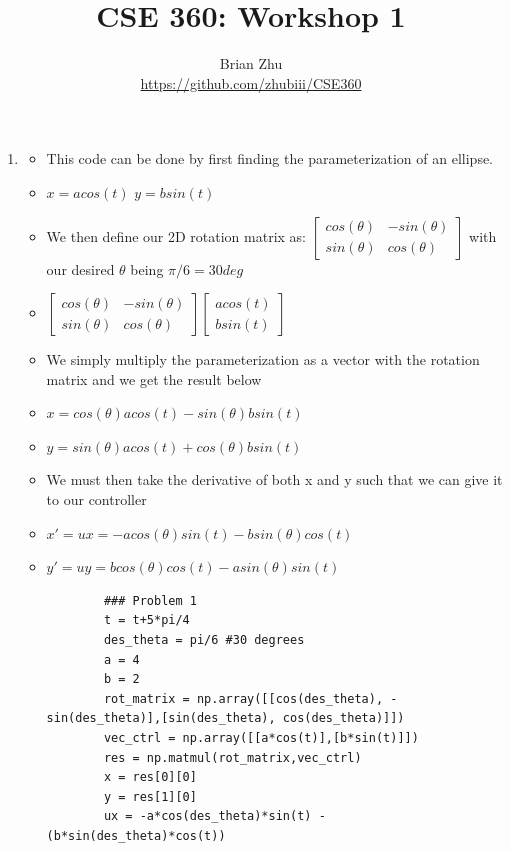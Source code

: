 \documentclass[10pt]{article}
\author{Brian Zhu\\
\url{https://github.com/zhubiii/CSE360} }
\date{}
\title{CSE 360: Workshop 1\\
}
\begin{document}
\maketitle
 
\begin{enumerate}
    \item
    \begin{itemize}
        \item This code can be done by first finding the parameterization of an ellipse.
        \item $x=acos(t)$ $y=bsin(t)$
        \item We then define our 2D rotation matrix as: $\begin{bmatrix}
            cos(\theta) & -sin(\theta) \\
            sin(\theta) & cos(\theta)
        \end{bmatrix}$ with our desired $\theta$ being $\pi / 6 = 30deg$
        \item $\begin{bmatrix}
            cos(\theta) & -sin(\theta) \\
            sin(\theta) & cos(\theta)
        \end{bmatrix} \begin{bmatrix}
            acos(t) \\
            bsin(t)
        \end{bmatrix}$
        \item We simply multiply the parameterization as a vector with the rotation matrix and we get the result below
        \item $x=cos(\theta)acos(t) - sin(\theta)bsin(t)$
        \item $y=sin(\theta)acos(t) + cos(\theta)bsin(t)$
        \item We must then take the derivative of both x and y such that we can give it to our controller
        \item $x'=ux=-acos(\theta)sin(t) - bsin(\theta)cos(t)$
        \item $y'=uy=bcos(\theta)cos(t) - asin(\theta)sin(t)$
        \begin{lstlisting}
        ### Problem 1
        t = t+5*pi/4 
        des_theta = pi/6 #30 degrees
        a = 4
        b = 2
        rot_matrix = np.array([[cos(des_theta), -sin(des_theta)],[sin(des_theta), cos(des_theta)]])
        vec_ctrl = np.array([[a*cos(t)],[b*sin(t)]])
        res = np.matmul(rot_matrix,vec_ctrl)
        x = res[0][0]
        y = res[1][0]
        ux = -a*cos(des_theta)*sin(t) - (b*sin(des_theta)*cos(t))

\end{lstlisting}
\end{itemize}
\end{enumerate}
\end{document}
